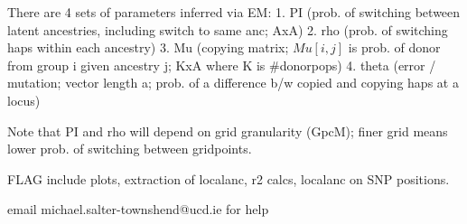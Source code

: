 \documentclass{article}
\begin{document}
There are 4 sets of parameters inferred via EM:
	1. PI (prob. of switching between latent ancestries, including switch to same anc; AxA)
	2. rho (prob. of switching haps within each ancestry)
	3. Mu (copying matrix; $Mu[i,j]$ is  prob. of donor from group i given ancestry j; KxA where K is \#donorpops) 
	4. theta (error / mutation; vector length a; prob. of a difference b/w copied and copying haps at a locus)

Note that PI and rho will depend on grid granularity (GpcM); finer grid means lower prob. of switching between gridpoints.


FLAG include plots, extraction of localanc, r2 calcs, localanc on SNP positions. 

email michael.salter-townshend@ucd.ie for help
\end{document}
